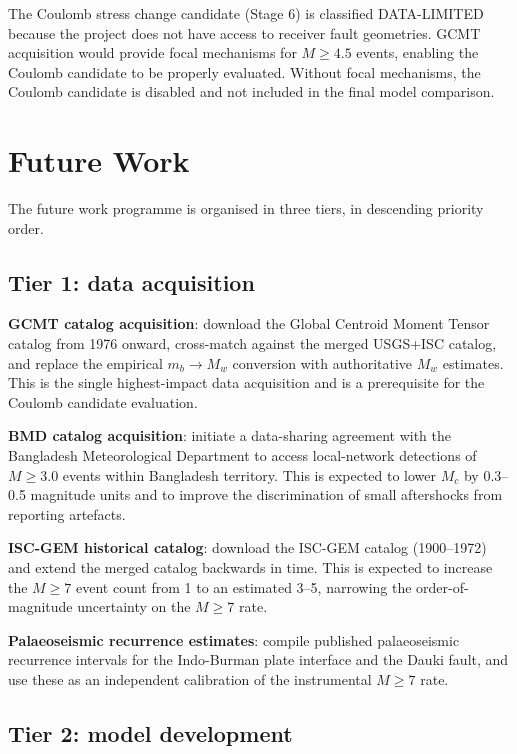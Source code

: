 \documentclass[10pt,a4paper,twocolumn]{article}
\begin{document}
The Coulomb stress change candidate (Stage 6) is classified DATA-LIMITED because the project does not have access to receiver fault geometries. GCMT acquisition would provide focal mechanisms for $M\geq4.5$ events, enabling the Coulomb candidate to be properly evaluated. Without focal mechanisms, the Coulomb candidate is disabled and not included in the final model comparison.

\section{Future Work}\label{sec:future}

The future work programme is organised in three tiers, in descending priority order.

\subsection{Tier 1: data acquisition}

\textbf{GCMT catalog acquisition}: download the Global Centroid Moment Tensor catalog from 1976 onward, cross-match against the merged USGS+ISC catalog, and replace the empirical $m_b\to M_w$ conversion with authoritative $M_w$ estimates. This is the single highest-impact data acquisition and is a prerequisite for the Coulomb candidate evaluation.

\textbf{BMD catalog acquisition}: initiate a data-sharing agreement with the Bangladesh Meteorological Department to access local-network detections of $M\geq3.0$ events within Bangladesh territory. This is expected to lower $M_c$ by 0.3--0.5 magnitude units and to improve the discrimination of small aftershocks from reporting artefacts.

\textbf{ISC-GEM historical catalog}: download the ISC-GEM catalog (1900--1972) and extend the merged catalog backwards in time. This is expected to increase the $M\geq7$ event count from 1 to an estimated 3--5, narrowing the order-of-magnitude uncertainty on the $M\geq7$ rate.

\textbf{Palaeoseismic recurrence estimates}: compile published palaeoseismic recurrence intervals for the Indo-Burman plate interface and the Dauki fault, and use these as an independent calibration of the instrumental $M\geq7$ rate.

\subsection{Tier 2: model development}
\end{document}
